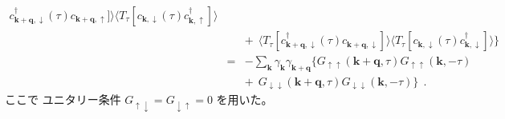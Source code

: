 \documentclass[a4j]{jsarticle}
\begin{document}
\begin{eqnarray}
			c_{ \bm{k}+\bm{q} , \downarrow }^{\dagger} (\tau)
			c_{ \bm{k}+\bm{q} , \uparrow }
		] \rangle
	\langle T_{\tau} [
			c_{ \bm{k} , \downarrow } (\tau)
			c_{ \bm{k} , \uparrow }^{\dagger}
		] \rangle
	\nonumber \\[2mm] && + \ \
	\langle T_{\tau} [
			c_{ \bm{k}+\bm{q} , \downarrow }^{\dagger} (\tau)
			c_{ \bm{k}+\bm{q} , \downarrow }
		] \rangle
	\langle T_{\tau} [
			c_{ \bm{k} , \downarrow } (\tau)
			c_{ \bm{k} , \downarrow }^{\dagger}
		] \rangle
	\Big\}
	\nonumber \\[3mm]
	&=&
	-
	\sum_{ \bm{k} }
	\gamma_{\bm{k}}
	\gamma_{\bm{k}+\bm{q}}
	\Big\{
	G_{\uparrow \uparrow}( \bm{k}+\bm{q} , \tau)
	G_{\uparrow \uparrow}( \bm{k} , - \tau)
	\nonumber \\[-1mm] && + \ \
	G_{\downarrow \downarrow}( \bm{k}+\bm{q} , \tau)
	G_{\downarrow \downarrow}( \bm{k} , - \tau)
	\Big\}
	\ \ .
\end{eqnarray}
%
%
%
%
ここで
ユニタリー条件
$G_{\uparrow \downarrow} = G_{\downarrow \uparrow} = 0$
を用いた。
\end{document}
